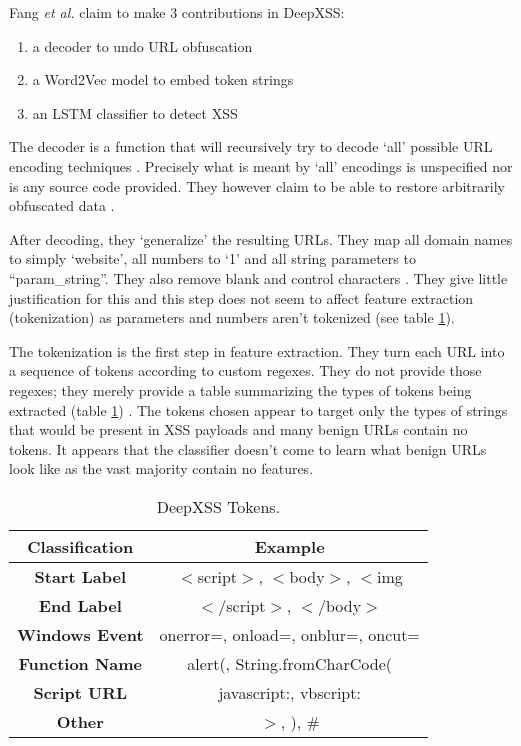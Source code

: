 Fang \textit{et al.} claim to make 3 contributions in DeepXSS:

\begin{enumerate}
\item a decoder to undo URL obfuscation
\item a Word2Vec model to embed token strings
\item an LSTM classifier to detect XSS
\end{enumerate}

The decoder is a function that will recursively try to decode `all' possible URL encoding techniques \cite{fang2018deepxss}. Precisely what is meant by `all' encodings is unspecified nor is any source code provided. They however claim to be able to restore arbitrarily obfuscated data \cite{fang2018deepxss}.

After decoding, they `generalize' the resulting URLs. They map all domain names to simply `website', all numbers to `1' and all string parameters to ``param\_string''. They also remove blank and control characters \cite{fang2018deepxss}. They give little justification for this and this step does not seem to affect feature extraction (tokenization) as parameters and numbers aren't tokenized (see table \ref{tok:tab}). 

The tokenization is the first step in feature extraction. They turn each URL into a sequence of tokens according to custom regexes. They do not provide those regexes; they merely provide a table summarizing the types of tokens being extracted (table \ref{tok:tab}) \cite{fang2018deepxss}. The tokens chosen appear to target only the types of strings that would be present in XSS payloads and many benign URLs contain no tokens. It appears that the classifier doesn't come to learn what benign URLs look like as the vast majority contain no features. 

\begin{table}
\begin{center}
\begingroup
\setlength{\tabcolsep}{5pt} %
\renewcommand{\arraystretch}{1.5} %
\begin{tabular}{||c | c||} 
    \hline
    Classification & Example \\ [0.5ex] 
    \hline\hline
    \textbf{Start Label} &  $<$script$>$, $<$body$>$, $<$img \\ 
    \hline
    \textbf{End Label} & $</$script$>$, $</$body$>$ \\
    \hline
    \textbf{Windows Event} & onerror=, onload=, onblur=, oncut= \\
    \hline
    \textbf{Function Name} & alert(, String.fromCharCode( \\
    \hline
    \textbf{Script URL} & javascript:, vbscript: \\ 
    \hline
    \textbf{Other} & $>$, ), \# \\ [1ex] 
    \hline
\end{tabular}
\endgroup
\caption{\label{tok:tab}DeepXSS Tokens.}
\end{center}
\end{table}

